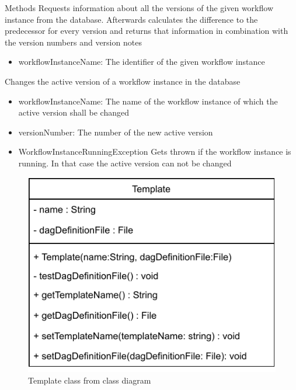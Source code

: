 \begin{methodenv}{Methods}
Requests information about all the versions of the given workflow instance from the database. Afterwards calculates the difference to the predecessor for every version and returns that information in combination with the version numbers and version notes

\begin{itemize}
	\item{workflowInstanceName:}
	The identifier of the given workflow instance
\end{itemize}

Changes the active version of a workflow instance in the database

\begin{itemize}
	\item{workflowInstanceName:}
	The name of the workflow instance of which the active version shall be changed
	\item{versionNumber:}
	The number of the new active version
\end{itemize}

\begin{itemize}
	\item{WorkflowInstanceRunningException}
	Gets thrown if the workflow instance is running. In that case the active version can not be changed
\end{itemize}
\end{methodenv}


\begin{figure}[h]
\centerline{\includegraphics[scale=1]{res/Klassen/Template.pdf}}
\caption{Template class from class diagram}
\end{figure}

